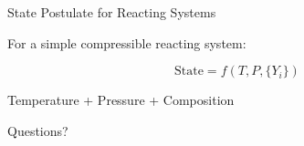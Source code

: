 \documentclass[aspectratio=169]{beamer}
\begin{document}
\begin{frame}{State Postulate for Reacting Systems}

For a simple compressible reacting system:

\[
\text{State} = f(T, P, \{Y_i\})
\]

\vspace{0.5cm}

Temperature + Pressure + Composition
\end{frame}

\begin{frame}
\centering
\Large Questions?
\end{frame}
\end{document}
